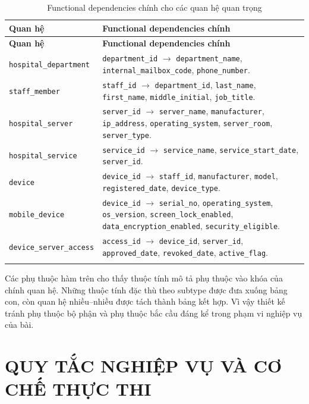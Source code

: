 \documentclass[12pt, a4paper, oneside, openany]{report}
\newcommand{\dbid}[1]{{\normalfont\ttfamily\footnotesize\nolinkurl{#1}}}
\newcommand{\tabdbid}[1]{{\normalfont\ttfamily\scriptsize\nolinkurl{#1}}}
\begin{document}
\begin{longtable}{|L{5.2cm}|L{8.4cm}|}
\hline
\normalfont\normalsize\textbf{Quan hệ} & \textbf{Functional dependencies chính} \\
\hline
\endfirsthead
\hline
\normalfont\normalsize\textbf{Quan hệ} & \textbf{Functional dependencies chính} \\
\hline
\endhead
\tabdbid{hospital_department} & \dbid{department_id} $\rightarrow$ \dbid{department_name}, \dbid{internal_mailbox_code}, \dbid{phone_number}. \\
\hline
\tabdbid{staff_member} & \dbid{staff_id} $\rightarrow$ \dbid{department_id}, \dbid{last_name}, \dbid{first_name}, \dbid{middle_initial}, \dbid{job_title}. \\
\hline
\tabdbid{hospital_server} & \dbid{server_id} $\rightarrow$ \dbid{server_name}, \dbid{manufacturer}, \dbid{ip_address}, \dbid{operating_system}, \dbid{server_room}, \dbid{server_type}. \\
\hline
\tabdbid{hospital_service} & \dbid{service_id} $\rightarrow$ \dbid{service_name}, \dbid{service_start_date}, \dbid{server_id}. \\
\hline
\tabdbid{device} & \dbid{device_id} $\rightarrow$ \dbid{staff_id}, \dbid{manufacturer}, \dbid{model}, \dbid{registered_date}, \dbid{device_type}. \\
\hline
\tabdbid{mobile_device} & \dbid{device_id} $\rightarrow$ \dbid{serial_no}, \dbid{operating_system}, \dbid{os_version}, \dbid{screen_lock_enabled}, \dbid{data_encryption_enabled}, \dbid{security_eligible}. \\
\hline
\tabdbid{device_server_access} & \dbid{access_id} $\rightarrow$ \dbid{device_id}, \dbid{server_id}, \dbid{approved_date}, \dbid{revoked_date}, \dbid{active_flag}. \\
\hline
\caption{Functional dependencies chính cho các quan hệ quan trọng}
\end{longtable}

Các phụ thuộc hàm trên cho thấy thuộc tính mô tả phụ thuộc vào khóa của chính quan hệ. Những thuộc tính đặc thù theo subtype được đưa xuống bảng con, còn quan hệ nhiều--nhiều được tách thành bảng kết hợp. Vì vậy thiết kế tránh phụ thuộc bộ phận và phụ thuộc bắc cầu đáng kể trong phạm vi nghiệp vụ của bài.

\chapter{QUY TẮC NGHIỆP VỤ VÀ CƠ CHẾ THỰC THI}
\end{document}
